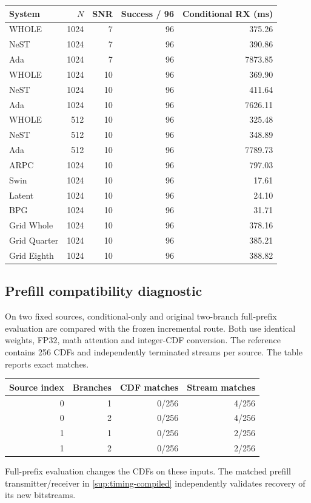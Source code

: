 \documentclass[10pt,letterpaper]{article}
\begin{document}
\begin{longtable}{@{}lrrrr@{}}\toprule
System & $N$ & SNR & Success / 96 & Conditional RX (ms)\\\midrule\endhead
WHOLE & 1024 & 7 & 96 & 375.26\\
NeST & 1024 & 7 & 96 & 390.86\\
Ada & 1024 & 7 & 96 & 7873.85\\
WHOLE & 1024 & 10 & 96 & 369.90\\
NeST & 1024 & 10 & 96 & 411.64\\
Ada & 1024 & 10 & 96 & 7626.11\\
WHOLE & 512 & 10 & 96 & 325.48\\
NeST & 512 & 10 & 96 & 348.89\\
Ada & 512 & 10 & 96 & 7789.73\\
ARPC & 1024 & 10 & 96 & 797.03\\
Swin & 1024 & 10 & 96 & 17.61\\
Latent & 1024 & 10 & 96 & 24.10\\
BPG & 1024 & 10 & 96 & 31.71\\
Grid Whole & 1024 & 10 & 96 & 378.16\\
Grid Quarter & 1024 & 10 & 96 & 385.21\\
Grid Eighth & 1024 & 10 & 96 & 388.82\\
\bottomrule\end{longtable}
\subsection{Prefill compatibility diagnostic}\label{sup:timing-prefill-diagnostic}
On two fixed sources, conditional-only and original two-branch full-prefix evaluation are compared with the frozen incremental route. Both use identical weights, FP32, math attention and integer-CDF conversion. The reference contains 256 CDFs and independently terminated streams per source. The table reports exact matches.

\begin{longtable}{@{}rrrr@{}}\toprule
Source index & Branches & CDF matches & Stream matches\\\midrule\endhead
0 & 1 & 0/256 & 4/256\\
0 & 2 & 0/256 & 4/256\\
1 & 1 & 0/256 & 2/256\\
1 & 2 & 0/256 & 2/256\\
\bottomrule\end{longtable}
Full-prefix evaluation changes the CDFs on these inputs. The matched prefill transmitter/receiver in \ref{sup:timing-compiled} independently validates recovery of its new bitstreams.
\end{document}
